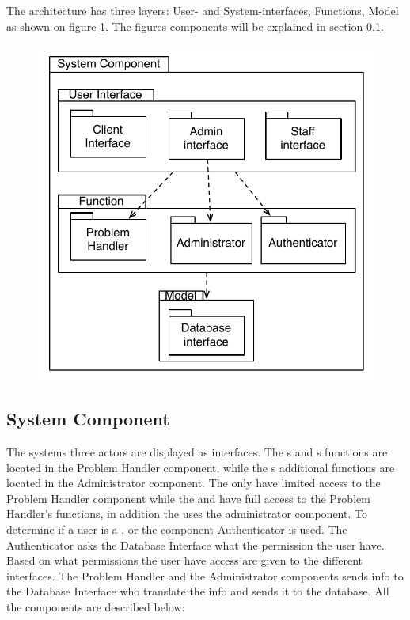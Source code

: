 The architecture has three layers: User- and System-interfaces, Functions, Model as shown on figure \ref{fig:SystemComponent}. The figures components will be explained in section \ref{sub:SystemComponent}.

\begin{figure}
	\centering
		\includegraphics[scale=0.5]{input/architectural_design/system_component_denvibruger.pdf}
	\label{fig:SystemComponent}
\end{figure}


\subsection{System Component}
\label{sub:SystemComponent}
The systems three actors are displayed as interfaces. The \aclient s and \astaff s functions are located in the Problem Handler component, while the \admin s additional functions are located in the Administrator component. The \aclient[] only have limited access to the Problem Handler component while the \astaff[] and \admin[] have full access to the Problem Handler's functions, in addition the \admin[] uses the administrator component. To determine if a user is a \aclient[], \astaff[] or \admin[] the component Authenticator is used. The Authenticator asks the Database Interface what the permission the user have. Based on what permissions the user have access are given to the different interfaces. The Problem Handler and the Administrator components sends info to the Database Interface who translate the info and sends it to the database. All the components are described below:

